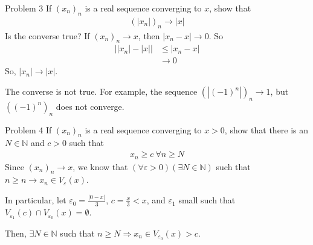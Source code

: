 \documentclass[10pt]{extarticle}
\newcommand{\N}{\mathbb{N}}
\begin{document}
  \begin{problem}{Problem 3}
    If $(x_n)_n$ is a real sequence converging to $x$, show that
    \begin{align*}
      (|x_n|)_n \rightarrow |x|
    \end{align*}
    Is the converse true?
    \tcblower
    If $(x_n)_n \rightarrow x$, then $|x_n - x| \rightarrow 0$. So
    \begin{align*}
      \left||x_n|-|x|\right| &\leq |x_n - x| \tag*{Reverse Triangle Inequality}\\
                  &\rightarrow 0
    \end{align*}
    So, $|x_n| \rightarrow |x|$.\newline

    The converse is not true. For example, the sequence $\left(|(-1)^n|\right)_n \rightarrow 1$, but $\left((-1)^n\right)_n$ does not converge.
  \end{problem}
  \begin{problem}{Problem 4}
    If $(x_n)_n$ is a real sequence converging to $x > 0$, show that there is an $N\in\N$ and $c > 0$ such that
    \begin{align*}
      x_n \geq c~\forall n\geq N
    \end{align*}
    \tcblower
    Since $(x_n)_n \rightarrow x$, we know that $(\forall \varepsilon > 0)(\exists N\in\N)$ such that $n\geq n \rightarrow x_n\in V_{\varepsilon}(x)$.\newline

    In particular, let $\varepsilon_0 = \frac{|0-x|}{3}$, $c = \frac{x}{3} < x$, and $\varepsilon_1$ small such that $V_{\varepsilon_1}(c) \cap V_{\varepsilon_0}(x) = \emptyset$.\newline

    Then, $\exists N\in\N$ such that $n\geq N \Rightarrow x_n\in V_{\varepsilon_0}(x) > c$.
  \end{problem}
\end{document}

